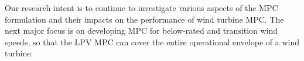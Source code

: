 \documentclass[letterpaper, 10 pt, conference]{ieeeconf}  %
\begin{document}
Our research intent is to continue to investigate various aspects of the MPC formulation and their impacts on the performance of wind turbine MPC. The next major focus is on developing MPC for below-rated and transition wind speeds, so that the LPV MPC can cover the entire operational envelope of a wind turbine.
   




\end{document}
